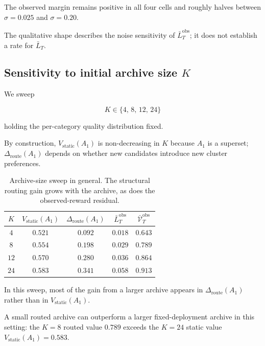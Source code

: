 \documentclass{article} %
\begin{document}
The observed margin remains positive in all four cells and roughly halves
between \(\sigma=0.025\) and \(\sigma=0.20\).

The qualitative shape describes the noise sensitivity of
\(\bar L_T^{\mathrm{obs}}\); it does not establish a rate for \(\bar L_T\).

\subsection{Sensitivity to initial archive size $K$}

\label{app:K-sweep}

We sweep

\begin{equation}
\label{eq:app-K-grid}
K \in \{4,\, 8,\, 12,\, 24\}
\end{equation}

holding the per-category quality distribution fixed.

By construction, $V_{\mathrm{static}}(A_1)$ is non-decreasing in $K$ because $A_1$ is a superset; $\Delta_{\mathrm{route}}(A_1)$ depends on whether new candidates introduce new cluster preferences.

\begin{table}[h]
\centering
\small
\begin{tabular}{ccccc}
\toprule
$K$ & $V_{\mathrm{static}}(A_1)$ & $\Delta_{\mathrm{route}}(A_1)$ & $\bar L_T^{\mathrm{obs}}$ & $\bar{\mathcal V}_T^{\mathrm{obs}}$ \\
\midrule
$4$  & $0.521$ & $0.092$ & $0.018$ & $0.643$ \\
$8$  & $0.554$ & $0.198$ & $0.029$ & $0.789$ \\
$12$ & $0.570$ & $0.280$ & $0.036$ & $0.864$ \\
$24$ & $0.583$ & $0.341$ & $0.058$ & $0.913$ \\
\bottomrule
\end{tabular}
\caption{Archive-size sweep in general. The structural routing gain grows with
the archive, as does the observed-reward residual.}
\label{tab:app-K-sweep}
\end{table}

In this sweep, most of the gain from a larger archive appears in $\Delta_{\mathrm{route}}(A_1)$ rather than in $V_{\mathrm{static}}(A_1)$.

A small routed archive can outperform a larger fixed-deployment archive in this setting: the $K=8$ routed value $0.789$ exceeds the $K=24$ static value $V_{\mathrm{static}}(A_1)=0.583$.
\end{document}
